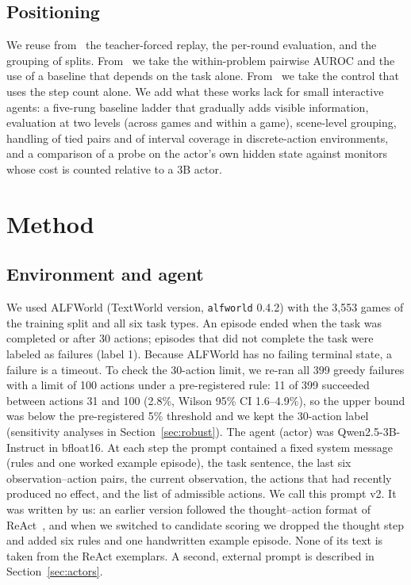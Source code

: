 \documentclass[11pt]{article}
\newcommand{\code}[1]{\texttt{#1}}
\begin{document}
\subsection{Positioning}
We reuse from~\cite{ruan2026doomed} the teacher-forced replay, the per-round evaluation, and the grouping of splits. From~\cite{bulut2026problem} we take the within-problem pairwise AUROC and the use of a baseline that depends on the task alone. From~\cite{wang2026failfast} we take the control that uses the step count alone.
We add what these works lack for small interactive agents: a five-rung baseline ladder that gradually adds visible information, evaluation at two levels (across games and within a game), scene-level grouping,
handling of tied pairs and of interval coverage in discrete-action environments, and a comparison of a probe on the actor's own hidden state against monitors whose cost is counted relative to a 3B actor.

\section{Method}

\subsection{Environment and agent}
We used ALFWorld (TextWorld version, \code{alfworld} 0.4.2) with the 3,553 games of the training split and all six task types.
An episode ended when the task was completed or after 30 actions; episodes that did not complete the task were labeled as failures (label 1).
Because ALFWorld has no failing terminal state, a failure is a timeout. To check the 30-action limit, we re-ran all 399 greedy failures with a limit of 100 actions under a pre-registered rule:
11 of 399 succeeded between actions 31 and 100 (2.8\%, Wilson 95\% CI 1.6--4.9\%), so the upper bound was below the pre-registered 5\% threshold and we kept the 30-action label (sensitivity analyses in Section~\ref{sec:robust}).
The agent (actor) was Qwen2.5-3B-Instruct in bfloat16. At each step the prompt contained a fixed system message (rules and one worked example episode),
the task sentence, the last six observation--action pairs, the current observation, the actions that had recently produced no effect, and the list of admissible actions.
We call this prompt v2. It was written by us: an earlier version followed the thought--action format of ReAct~\cite{yao2023react}, and when we switched to candidate scoring we dropped the thought step
and added six rules and one handwritten example episode. None of its text is taken from the ReAct exemplars. A second, external prompt is described in Section~\ref{sec:actors}.
\end{document}
